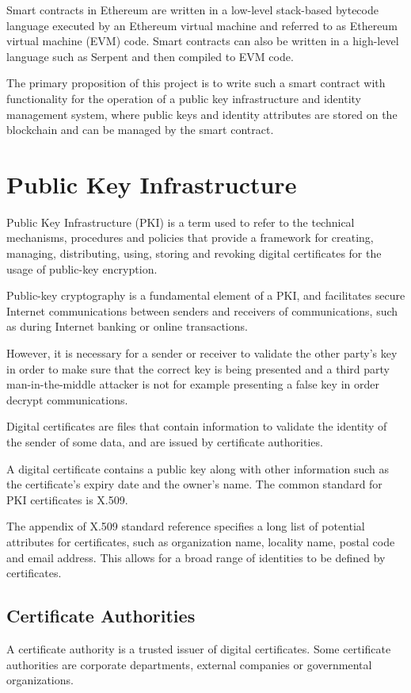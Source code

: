 \documentclass[12pt]{report}
\begin{document}
	Smart contracts in Ethereum are written in a low-level stack-based bytecode language executed by an Ethereum virtual machine and referred to as Ethereum virtual machine (EVM) code. Smart contracts can also be written in a high-level language such as Serpent and then compiled to EVM code.\cite{3}
	
	The primary proposition of this project is to write such a smart contract with functionality for the operation of a public key infrastructure and identity management system, where public keys and identity attributes are stored on the blockchain and can be managed by the smart contract.
	
	\section{Public Key Infrastructure}
	Public Key Infrastructure (PKI) is a term used to refer to the technical mechanisms, procedures and policies that provide a framework for creating, managing, distributing, using, storing and revoking digital certificates for the usage of public-key encryption.\cite{26}\cite{27}
	
	Public-key cryptography is a fundamental element of a PKI, and facilitates secure Internet communications between senders and receivers of communications, such as during Internet banking or online transactions.
	
	However, it is necessary for a sender or receiver to validate the other party's key in order to make sure that the correct key is being presented and a third party man-in-the-middle attacker is not for example presenting a false key in order decrypt communications.
	
	Digital certificates are files that contain information to validate the identity of the sender of some data, and are issued by certificate authorities.
	
	A digital certificate contains a public key along with other information such as the certificate's expiry date and the owner's name. The common standard for PKI certificates is X.509.\cite{28}
	
	The appendix of X.509 standard reference specifies a long list of potential attributes for certificates, such as organization name, locality name, postal code and email address. This allows for a broad range of identities to be defined by certificates.
	
	\subsection{Certificate Authorities}
	A certificate authority is a trusted issuer of digital certificates. Some certificate authorities are corporate departments, external companies or governmental organizations.
	
\end{document}
